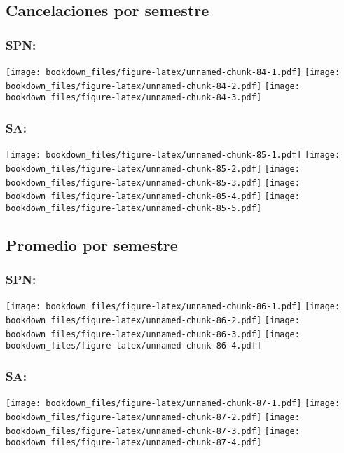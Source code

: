 \documentclass[]{article}
\theoremstyle{definition}
\theoremstyle{definition}
\theoremstyle{definition}
\theoremstyle{remark}
\begin{document}
\subsection{Cancelaciones por
semestre}\label{cancelaciones-por-semestre-1}

\subsubsection{SPN:}\label{spn-2}

\texttt{[image: bookdown\_files/figure-latex/unnamed-chunk-84-1.pdf]}
\texttt{[image: bookdown\_files/figure-latex/unnamed-chunk-84-2.pdf]}
\texttt{[image: bookdown\_files/figure-latex/unnamed-chunk-84-3.pdf]}

\subsubsection{SA:}\label{sa-2}

\texttt{[image: bookdown\_files/figure-latex/unnamed-chunk-85-1.pdf]}
\texttt{[image: bookdown\_files/figure-latex/unnamed-chunk-85-2.pdf]}
\texttt{[image: bookdown\_files/figure-latex/unnamed-chunk-85-3.pdf]}
\texttt{[image: bookdown\_files/figure-latex/unnamed-chunk-85-4.pdf]}
\texttt{[image: bookdown\_files/figure-latex/unnamed-chunk-85-5.pdf]}

\subsection{Promedio por semestre}\label{promedio-por-semestre-1}

\subsubsection{SPN:}\label{spn-3}

\texttt{[image: bookdown\_files/figure-latex/unnamed-chunk-86-1.pdf]}
\texttt{[image: bookdown\_files/figure-latex/unnamed-chunk-86-2.pdf]}
\texttt{[image: bookdown\_files/figure-latex/unnamed-chunk-86-3.pdf]}
\texttt{[image: bookdown\_files/figure-latex/unnamed-chunk-86-4.pdf]}

\subsubsection{SA:}\label{sa-3}

\texttt{[image: bookdown\_files/figure-latex/unnamed-chunk-87-1.pdf]}
\texttt{[image: bookdown\_files/figure-latex/unnamed-chunk-87-2.pdf]}
\texttt{[image: bookdown\_files/figure-latex/unnamed-chunk-87-3.pdf]}
\texttt{[image: bookdown\_files/figure-latex/unnamed-chunk-87-4.pdf]}
\end{document}
